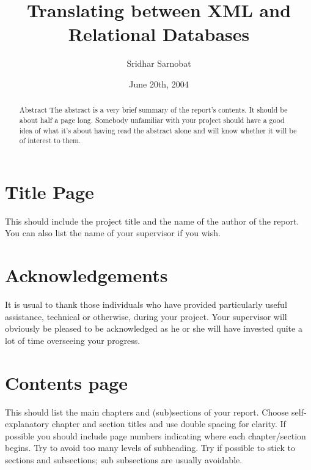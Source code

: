 \documentclass{report}
\begin{document}
\title{Translating between XML and Relational Databases}
\author{Sridhar Sarnobat}
\date{June 20th, 2004}
\maketitle

\tableofcontents

\begin{abstract}
Abstract The abstract is a very brief summary of the report's contents. It should be about half a page long. Somebody unfamiliar with your project should have a good idea of what it's about having read the abstract alone and will know whether it will be of interest to them. 
\end{abstract}



\section{Title Page}
This should include the project title and the name of the author of the report. You can also list the name of your supervisor if you wish. 

\section{Acknowledgements}
It is usual to thank those individuals who have provided particularly useful assistance, technical or otherwise, during your project. Your supervisor will obviously be pleased to be acknowledged as he or she will have invested quite a lot of time overseeing your progress. 

\section{Contents page}
This should list the main chapters and (sub)sections of your report. Choose self-explanatory chapter and section titles and use double spacing for clarity. If possible you should include page numbers indicating where each chapter/section begins. Try to avoid too many levels of subheading. Try if possible to stick to sections and subsections; sub subsections are usually avoidable. 
\end{document}
